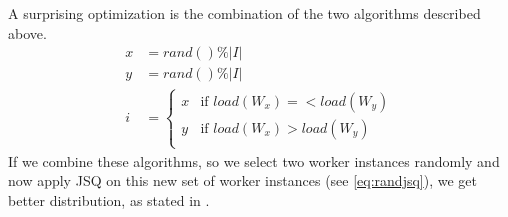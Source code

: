 A surprising optimization is the combination of the two algorithms described
above.
\begin{equation}
    \begin{aligned}
        x &= rand() \% |I| \\
        y &= rand() \% |I| \\
        i &= \begin{cases}
            x & \text{if } load(W_x) =< load(W_y)\\
            y & \text{if } load(W_x) > load(W_y)\\
        \end{cases}
    \end{aligned}
    \label{eq:randjsq}
\end{equation}
If we combine these algorithms, so we select two worker instances randomly and
now apply \ac{JSQ} on this new set of worker instances (see \ref{eq:randjsq}),
we get better distribution, as stated in \cite{powerOfTwoInRLB}.

